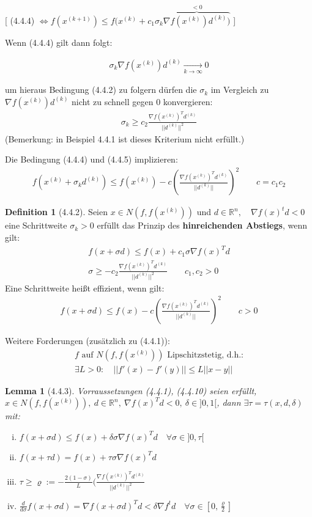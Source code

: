 \documentclass[ngerman,halfparskip]{scrartcl}
\newtheorem*{lemma}{Lemma}
\theoremstyle{definition}
\newtheorem*{defin}{Definition}
\newcommand*{\R}{\mathbb{R}}      %
\begin{document}
[ (4.4.4) $\Leftrightarrow f(x^{(k+1)})\leq f(x^{(k)}+c_1\sigma_k\overbrace{\nabla f(x^{(k)})d^{(k)})}^{<0}$ ]

Wenn (4.4.4) gilt dann folgt:

\begin{gather*}
\sigma_k\nabla f(x^{(k)})d^{(k)}\xrightarrow[k\rightarrow \infty]{}0
\end{gather*}

um hieraus Bedingung (4.4.2) zu folgern dürfen die $\sigma_k$ im Vergleich zu $\nabla f (x^{(k)})d^{(k)}$ nicht zu schnell gegen $0$ konvergieren:
\begin{gather*}
\sigma_k\geq c_2 \frac{\nabla f(x^{(k)})^Td^{(k)}}{||d^{(k)}||^2}
\end{gather*}
(Bemerkung: in Beispiel 4.4.1 ist dieses Kriterium nicht erfüllt.)

Die Bedingung (4.4.4) und (4.4.5) implizieren:
\begin{gather*}\tag{4.4.6}
f(x^{(k)}+\sigma_kd^{(k)})\leq f(x^{(k)}) - c\left( \frac{\nabla f(x^{(k)})^Td^{(k)}}{||d^{(k)}||} \right)^2 \qquad c=c_1c_2
\end{gather*}

\begin{defin}[4.4.2]
Seien $x\in N(f,f(x^{(k)}))$ und $d\in\R^n, \quad \nabla f (x)^t d<0$ eine Schrittweite $\sigma_k>0$ erfüllt das Prinzip des \textbf{hinreichenden Abstiegs}, wenn gilt:
\begin{gather*}\tag{4.4.7}
f(x+\sigma d)\leq f(x)+c_1\sigma\nabla f(x)^Td\\
\tag{4.4.8} \sigma \geq -c_2 \frac{\nabla f(x^{(k)})^Td^{(k)}}{||d^{(k)}||^2} \qquad c_1,c_2>0
\end{gather*}
Eine Schrittweite heißt effizient, wenn gilt:
\begin{gather*}
\tag{4.4.9} f(x+\sigma d)\leq f(x)-c\left( \frac{\nabla f(x^{(k)})^Td^{(k)}}{||d^{(k)}||} \right)^2 \qquad c>0
\end{gather*}
\end{defin}

Weitere Forderungen (zusätzlich zu (4.4.1)):
\begin{gather*}
\tag{4.4.10} f\text{ auf } N(f,f(x^{(k)})) \text{ Lipschitzstetig, d.h.:}\\
\exists L>0: \quad ||f'(x)-f'(y)||\leq L||x-y||
\end{gather*}

\begin{lemma}[4.4.3]
Vorraussetzungen (4.4.1), (4.4.10) seien erfüllt, $x\in N(f,f(x^{(k)})),~ d\in\R^n,~ \nabla f(x)^Td<0,~ \delta \in ]0,1[$, dann $\exists \tau=\tau(x,d,\delta)$ mit:
\begin{enumerate}[(i)]
\item  $f(x+\sigma d)\leq f(x)+\delta\sigma\nabla f(x)^Td \quad \forall \sigma \in ]0,\tau[$
\item $f(x+\tau d)= f(x)+\tau\sigma\nabla f(x)^Td$
\item $\tau\geq \varrho :=-\frac{2(1-\sigma)}L( \frac{\nabla f(x^{(k)})^Td^{(k)}}{||d^{(k)}||^2}$
\item  $\frac d{d\sigma}f(x+\sigma d)=\nabla f(x+\sigma d)^Td < \delta\nabla f^td \quad \forall \sigma \in [0,\frac \varrho 2]$ 
\end{enumerate}
\end{lemma}
\end{document}

